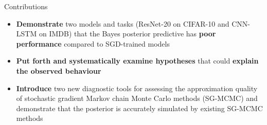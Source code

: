 \documentclass[mathserif,dvipsnames,table,xcdraw]{beamer}
\begin{document}
	\begin{frame}{Contributions}
		\begin{itemize}
			\item<1-> \textbf{Demonstrate} two models and tasks (ResNet-20 on CIFAR-10 and CNN-LSTM on IMDB) that the Bayes posterior predictive has \textbf{poor performance} compared to SGD-trained models
			\item<2-> \textbf{Put forth and systematically examine hypotheses} that could \textbf{explain the observed behaviour}
			\item<3-> \textbf{Introduce} two new diagnostic tools for assessing the approximation quality of stochastic gradient	Markov chain Monte Carlo methods (SG-MCMC) and demonstrate that the posterior is accurately simulated by existing SG-MCMC methods 
		\end{itemize}
	\end{frame}
\end{document}
